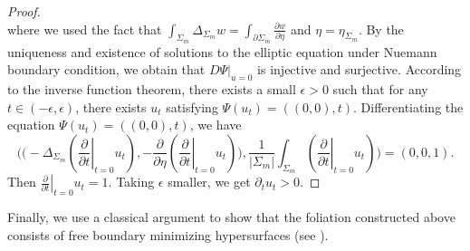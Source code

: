 \documentclass[11pt,letterpaper]{amsart}
\theoremstyle{definition}
\theoremstyle{remark}
\numberwithin{equation}{section}
\begin{document}
\begin{proof}
\[    \]
    where we used the fact that $\int_{\Sigma_{m}}\Delta_{\Sigma_{m}}w=\int_{\partial \Sigma_{m}}\frac{\partial w}{\partial \eta}$ and $\eta = \eta_{\Sigma_{m}}$.
    By the uniqueness and existence of solutions to the elliptic equation under Nuemann boundary condition, we obtain that $D\Psi|_{u=0}$ is injective and surjective. According to the inverse function theorem, there exists a small $\epsilon>0$ such that for any $t\in (-\epsilon,\epsilon)$, there exists $u_{t}$ satisfying $\Psi(u_{t})=((0,0),t)$. Differentiating the equation $\Psi(u_{t})=((0,0),t)$, we have
    \[
    \Big(\big(-\Delta_{\Sigma_{m}}(\left.\frac{\partial }{\partial t}\right|_{t=0}u_{t}),-\frac{\partial}{\partial\eta}(\left.\frac{\partial}{\partial t}\right|_{t=0}u_{t})\big),\frac{1}{|\Sigma_{m}|}\int_{\Sigma_{m}}(\left.\frac{\partial}{\partial t}\right|_{t=0}u_{t})\Big)=(0,0,1).
    \]
    Then $\left.\frac{\partial}{\partial t}\right|_{t=0}u_{t}=1$. Taking $\epsilon$ smaller, we get $\partial_{t}u_{t}>0$. 
\end{proof}

Finally, we use a classical argument to show that the foliation constructed above consists of free boundary minimizing hypersurfaces (see \cite{XuTrans}).
\end{document}
